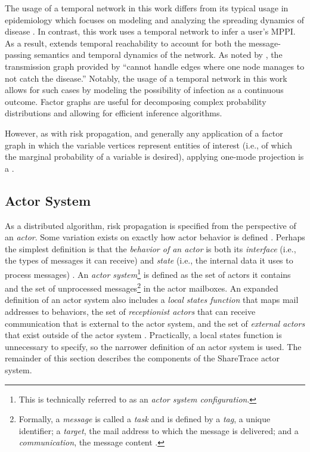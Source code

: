 The usage of a temporal network in this work differs from its typical usage in epidemiology which focuses on modeling and analyzing the spreading dynamics of disease \citep{Riolo2001, Danon2011, Lokhov2014, Craft2015, Pastor-Satorras2015, Koher2019, Zino2021}. In contrast, this work uses a temporal network to infer a user's MPPI. As a result,  extends temporal reachability to account for both the message-passing semantics and temporal dynamics of the network. As noted by \citet{Holme2012}, the transmission graph provided by \citet{Riolo2001} ``cannot handle edges where one node manages to not catch the disease.'' Notably, the usage of a temporal network in this work allows for such cases by modeling the possibility of infection as a continuous outcome.
Factor graphs are useful for decomposing complex probability distributions and allowing for efficient inference algorithms.

However, as with risk propagation, and generally any application of a factor graph in which the variable vertices represent entities of interest (i.e., of which the marginal probability of a variable is desired), applying one-mode projection is a .

\subsection{Actor System}

As a distributed algorithm, risk propagation is specified from the perspective of an \emph{actor}. Some variation exists on exactly how actor behavior is defined \citep{Agha1985, Koster2016}. Perhaps the simplest definition is that the \emph{behavior of an actor} is both its \emph{interface} (i.e., the types of messages it can receive) and \emph{state} (i.e., the internal data it uses to process messages) \citep{Koster2016}. An \emph{actor system}\footnote{This is technically referred to as an \emph{actor system configuration}.} is defined as the set of actors it contains and the set of unprocessed messages\footnote{Formally, a \emph{message} is called a \emph{task} and is defined by a \emph{tag}, a unique identifier; a \emph{target}, the mail address to which the message is delivered; and a \emph{communication}, the message content \citep{Agha1985}.} in the actor mailboxes. An expanded definition of an actor system also includes a \emph{local states function} that maps mail addresses to behaviors, the set of \emph{receptionist actors} that can receive communication that is external to the actor system, and the set of \emph{external actors} that exist outside of the actor system \citep{Agha1985}. Practically, a local states function is unnecessary to specify, so the narrower definition of an actor system is used. The remainder of this section describes the components of the ShareTrace actor system.

